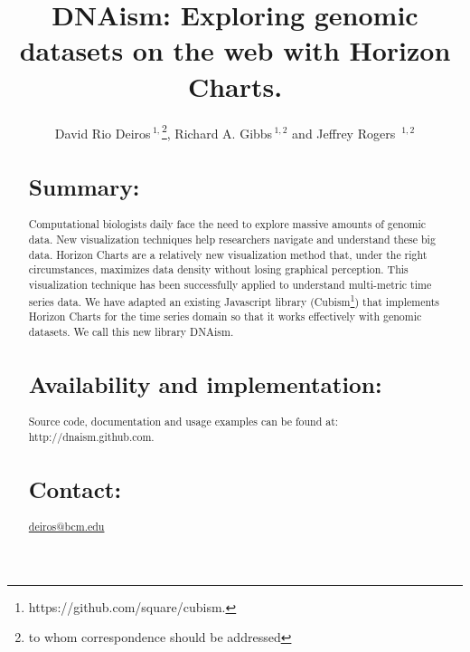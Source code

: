 \documentclass{bioinfo}
\begin{document}

\title[short Title]{DNAism: Exploring genomic datasets on the web with Horizon Charts. }

\author[Sample \textit{et~al}]{David Rio Deiros\,$^{1,}$\footnote{to whom correspondence should be addressed},
Richard A. Gibbs\,$^{1,2}$ and Jeffrey Rogers\, $^{1,2}$}

\address{$^{1}$Human Genome Sequencing Center, Baylor College of Medicine, Houston, TX.\\
$^{2}$Department of Molecular and Human Genetics, Baylor College of Medicine, Houston, TX.}



\maketitle

\begin{abstract}

\section{Summary:}

Computational biologists daily face the need to explore massive amounts of
genomic data.  New visualization techniques help researchers navigate and
understand these big data. Horizon Charts are a
relatively new visualization method that, under the right
circumstances, maximizes data density without losing
graphical perception. This visualization technique has been successfully
applied to understand multi-metric time series
data. We have adapted an existing Javascript
library (Cubism\footnote{https://github.com/square/cubism.}) that implements
Horizon Charts for the time series domain so that it works effectively with
genomic datasets. We call this new library DNAism. 

\section{Availability and implementation:}
Source code, documentation and usage examples can be found at:
http://dnaism.github.com.

\section{Contact:} \href{deiros@bcm.edu}{deiros@bcm.edu}
\end{abstract}
\end{document}
